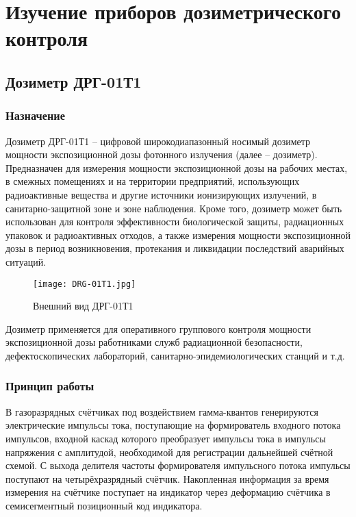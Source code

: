 \chapter{Изучение приборов дозиметрического контроля} \label{chap2}
\section{Дозиметр ДРГ-01Т1} \label{sect2_1}
\subsection{Назначение} \label{subsect2_1_1}
    Дозиметр ДРГ-01Т1 -- цифровой широкодиапазонный носимый дозиметр мощности 
    экспозиционной дозы фотонного излучения (далее -- дозиметр). Предназначен 
    для измерения мощности экспозиционной дозы на рабочих местах, в смежных 
    помещениях и на территории предприятий, использующих радиоактивные 
    вещества и другие источники ионизирующих излучений, в санитарно-защитной 
    зоне и зоне наблюдения. Кроме того, дозиметр может быть использован для 
    контроля эффективности биологической защиты, радиационных упаковок и 
    радиоактивных отходов, а также измерения мощности экспозиционной дозы в 
    период возникновения, протекания и ликвидации последствий аварийных 
    ситуаций.

    \begin{figure}[ht]
		\centering
		\texttt{[image: DRG-01T1.jpg]}
		\caption{Внешний вид ДРГ-01Т1}
	\end{figure}

    Дозиметр применяется для оперативного группового контроля мощности 
    экспозиционной дозы работниками служб радиационной безопасности, 
    дефектоскопических лабораторий, санитарно-эпидемиологических станций и
    т.д.

\subsection{Принцип работы} \label{subsect2_1_3}
    В газоразрядных счётчиках под воздействием гамма-квантов генерируются 
    электрические импульсы тока, поступающие на формирователь входного потока 
    импульсов, входной каскад которого преобразует импульсы тока в импульсы 
    напряжения с амплитудой, необходимой для регистрации дальнейшей счётной 
    схемой. С выхода делителя частоты формирователя импульсного потока импульсы 
    поступают на четырёхразрядный счётчик. Накопленная информация за время 
    измерения на счётчике поступает на индикатор через деформацию счётчика 
    в семисегментный позиционный код индикатора.

